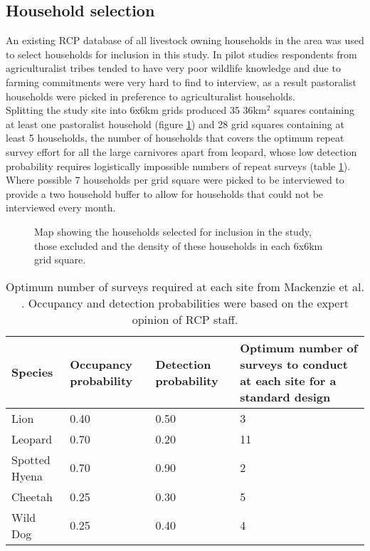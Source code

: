 \subsection*{Household selection}

An existing RCP database of all livestock owning households in the area was used to select households for inclusion in this study. In pilot studies respondents from agriculturalist tribes tended to have very poor wildlife knowledge and due to farming commitments were very hard to find to interview, as a result pastoralist households were picked in preference to agriculturalist households.\\

Splitting the study site into 6x6km grids produced 35 36km$^2$ squares containing at least one pastoralist household (figure \ref{fig:HH_selection}) and 28 grid squares containing at least 5 households, the number of households that covers the optimum repeat survey effort for all the large carnivores apart from leopard, whose low detection probability requires logistically impossible numbers of repeat surveys (table \ref{table:OptimumRepeats}). Where possible 7 households per grid square were picked to be interviewed to provide a two household buffer to allow for households that could not be interviewed every month.\\

\begin{figure}[h]
\centering
\setlength\fboxsep{0pt}
\setlength\fboxrule{0.5pt}
\caption{Map showing the households selected for inclusion in the study, those excluded and the density of these households in each 6x6km grid square.}
\label{fig:HH_selection}
\end{figure}

\begin{table}[h]
	\small
	\begin{center}
		\begin{tabular}{l p{3cm} p{3cm} p{5cm}}
			\hline \hline		
			Species 			& Occupancy probability	 	& Detection probability & Optimum number of surveys to conduct at each site for a standard design \cite{Mackenzie2005b}\\ \hline
			Lion 			& 0.40						& 0.50 & 3\\
			Leopard 			& 0.70						& 0.20 & 11\\
			Spotted Hyena 	& 0.70						& 0.90 & 2\\
			Cheetah 			& 0.25						& 0.30 & 5\\
			Wild Dog 		& 0.25						& 0.40 & 4\\
			\hline \hline						
		\end{tabular}
		\caption{Optimum number of surveys required at each site from Mackenzie et al. \cite{Mackenzie2005b}. Occupancy and detection probabilities were based on the expert opinion of RCP staff.}
	\label{table:OptimumRepeats}
	\end{center}
\end{table}

